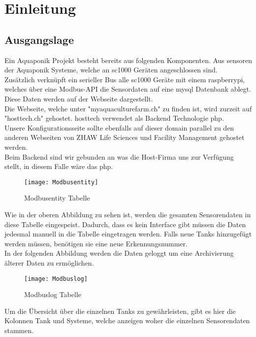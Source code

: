 \documentclass[../main.tex]{subfiles}
\begin{document}
	
	
	\section{Einleitung}
	
	\subsection{Ausgangslage}
	Ein Aquaponik Projekt besteht bereits aus folgenden Komponenten. Aus \gls{sensor}en der Aquaponik Systeme, welche an \gls{sc1000} Geräten angeschlossen sind. \\
	Zusätzlich verknüpft ein serieller Bus alle \gls{sc1000} Geräte mit einem \gls{raspberrypi}, welches über eine Modbus-API die Sensordaten auf eine \gls{mysql} Datenbank ablegt. Diese Daten werden auf der Webseite dargestellt. \\
	Die Webseite, welche unter "myaquaculturefarm.ch" zu finden ist, wird zurzeit auf "hosttech.ch" gehostet. \gls{hosttech} verwendet als Backend Technologie \gls{php}.\\
	Unsere Konfigurationsseite sollte ebenfalls auf dieser \gls{domain} parallel zu den anderen Webseiten von ZHAW Life Sciences und Facility Management gehostet werden. \\
	Beim Backend sind wir gebunden an was die Host-Firma uns zur Verfügung stellt, in diesem Falle wäre das \gls{php}.
	
	\begin{figure}[H]
		\centering
		\texttt{[image: Modbusentity]}
		\caption{Modbusentity Tabelle}
		\label{fig:Modbusentity}
	\end{figure}
	\par \noindent
	Wie in der oberen Abbildung zu sehen ist, werden die gesamten Sensorendaten in diese Tabelle eingespeist. Dadurch, dass es kein Interface gibt müssen die Daten jedesmal manuell in die Tabelle eingetragen werden. Falls neue Tanks hinzugefügt werden müssen, benötigen sie eine neue Erkennungsnummer.  \\
	In der folgenden Abbildung werden die Daten geloggt um eine Archivierung älterer Daten zu ermöglichen.
	
	\begin{figure}[H]
		\centering
		\texttt{[image: Modbuslog]}
		\caption{Modbuslog Tabelle}
		\label{fig:Modbuslog}
	\end{figure}
	\par \noindent	
	Um die Übersicht über die einzelnen Tanks zu gewährleisten, gibt es hier die Kolonnen Tank und Systeme, welche anzeigen woher die einzelnen Sensorendaten stammen.
	
\end{document}
